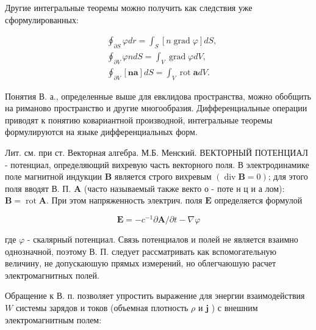 \documentclass[10pt]{article}
\begin{document}
Другие интегральные теоремы можно получить как следствия уже сформулированных:



\[

\begin{aligned}

& \oint_{\partial S} \varphi d r=\int_{S}[n \operatorname{grad} \varphi] d S, \\

& \oint_{\partial V} \varphi n d S=\int_{V} \operatorname{grad} \varphi d V, \\

& \oint_{\partial V}[\boldsymbol{n a}] d S=\int_{V} \operatorname{rot} \boldsymbol{a} d V .

\end{aligned}

\]



Понятия В. а., определенные выше для евклидова пространства, можно обобщить на риманово пространство и другие многообразия. Дифференциальные операции приводят к понятию ковариантной производной, интегральные теоремы формулируются на языке дифференциальных форм.



Лит. см. при ст. Векторная алгебра. М.Б. Менский. ВЕКТОРНЫЙ ПОТЕНЦИАЛ - потенциал, определяющий вихревую часть векторного поля. В электродинамике поле магнитной индукции $\boldsymbol{B}$ является строго вихревым $(\operatorname{div} \boldsymbol{B}=0)$; для этого поля вводят В. П. $\boldsymbol{A}$ (часто называемый также векто о - поте н ц и а лом): $\boldsymbol{B}=\operatorname{rot} \boldsymbol{A}$. При этом напряженность электрич. поля $\boldsymbol{E}$ определяется формулой



\[

\boldsymbol{E}=-c^{-1} \partial \boldsymbol{A} / \partial t-\nabla \varphi

\]



где $\varphi$ - скалярный потенциал. Связь потенциалов и полей не является взаимно однозначной, поэтому В. П. следует рассматривать как вспомогательную величину, не допускаюшую прямых измерений, но облегчаюшую расчет электромагнитных полей.



Обращение к В. п. позволяет упростить выражение для энергии взаимодействия $W$ системы зарядов и токов (объемная плотность $\rho$ и $\boldsymbol{j}$ ) с внешним электромагнитным полем:
\end{document}
